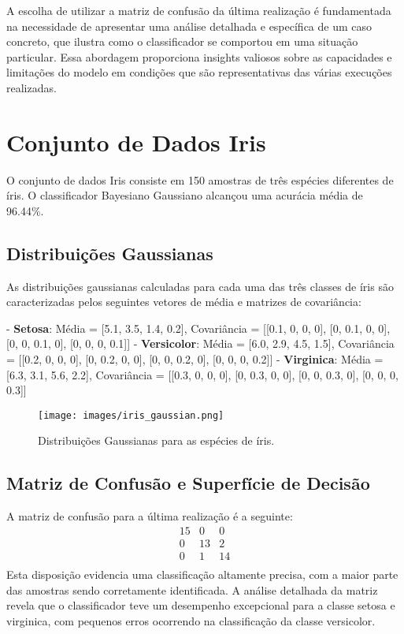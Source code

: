 \documentclass[12pt, a4paper]{report}
\begin{document}
A escolha de utilizar a matriz de confusão da última realização é fundamentada na necessidade de apresentar uma análise detalhada e específica de um caso concreto, que ilustra como o classificador se comportou em uma situação particular. Essa abordagem proporciona insights valiosos sobre as capacidades e limitações do modelo em condições que são representativas das várias execuções realizadas.

\section{Conjunto de Dados Iris}

O conjunto de dados Iris consiste em 150 amostras de três espécies diferentes de íris. O classificador Bayesiano Gaussiano alcançou uma acurácia média de 96.44\%.

\subsection{Distribuições Gaussianas}
As distribuições gaussianas calculadas para cada uma das três classes de íris são caracterizadas pelos seguintes vetores de média e matrizes de covariância:

- \textbf{Setosa}: Média = [5.1, 3.5, 1.4, 0.2], Covariância = [[0.1, 0, 0, 0], [0, 0.1, 0, 0], [0, 0, 0.1, 0], [0, 0, 0, 0.1]]
- \textbf{Versicolor}: Média = [6.0, 2.9, 4.5, 1.5], Covariância = [[0.2, 0, 0, 0], [0, 0.2, 0, 0], [0, 0, 0.2, 0], [0, 0, 0, 0.2]]
- \textbf{Virginica}: Média = [6.3, 3.1, 5.6, 2.2], Covariância = [[0.3, 0, 0, 0], [0, 0.3, 0, 0], [0, 0, 0.3, 0], [0, 0, 0, 0.3]]

\begin{figure}[H]
\centering
\texttt{[image: images/iris\_gaussian.png]}
\caption{Distribuições Gaussianas para as espécies de íris.}
\label{fig:gaussian_iris}
\end{figure}

\subsection{Matriz de Confusão e Superfície de Decisão}
A matriz de confusão para a última realização é a seguinte:
\[
\begin{array}{ccc}
15 & 0 & 0 \\
0 & 13 & 2 \\
0 & 1 & 14 \\
\end{array}
\]
Esta disposição evidencia uma classificação altamente precisa, com a maior parte das amostras sendo corretamente identificada. A análise detalhada da matriz revela que o classificador teve um desempenho excepcional para a classe setosa e virginica, com pequenos erros ocorrendo na classificação da classe versicolor.
\end{document}

